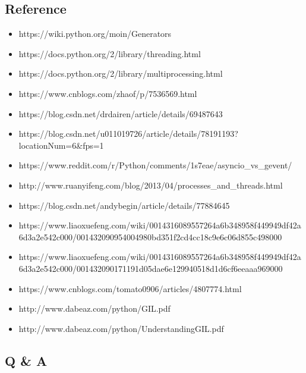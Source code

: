 \documentclass[11pt]{article}
\providecommand{\tightlist}{%
      \setlength{\itemsep}{0pt}\setlength{\parskip}{0pt}}
\begin{document}
    \hypertarget{reference}{%
\subsection{Reference}\label{reference}}

\begin{itemize}
\tightlist
\item
  https://wiki.python.org/moin/Generators
\item
  https://docs.python.org/2/library/threading.html
\item
  https://docs.python.org/2/library/multiprocessing.html
\item
  https://www.cnblogs.com/zhaof/p/7536569.html
\item
  https://blog.csdn.net/drdairen/article/details/69487643
\item
  https://blog.csdn.net/u011019726/article/details/78191193?locationNum=6\&fps=1
\item
  https://www.reddit.com/r/Python/comments/1s7eae/asyncio\_vs\_gevent/
\item
  http://www.ruanyifeng.com/blog/2013/04/processes\_and\_threads.html
\item
  https://blog.csdn.net/andybegin/article/details/77884645
\item
  https://www.liaoxuefeng.com/wiki/0014316089557264a6b348958f449949df42a6d3a2e542c000/001432090954004980bd351f2cd4cc18c9e6c06d855c498000
\item
  https://www.liaoxuefeng.com/wiki/0014316089557264a6b348958f449949df42a6d3a2e542c000/001432090171191d05dae6e129940518d1d6cf6eeaaa969000
\item
  https://www.cnblogs.com/tomato0906/articles/4807774.html
\item
  http://www.dabeaz.com/python/GIL.pdf
\item
  http://www.dabeaz.com/python/UnderstandingGIL.pdf
\end{itemize}

    \hypertarget{q-a}{%
\subsection{Q \& A}\label{q-a}}


    
    
    
    
\end{document}
